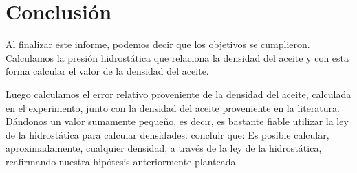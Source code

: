 \documentclass[a4paper, 12p]{article}
\begin{document}
\section{Conclusión}

Al finalizar este informe, podemos decir que los objetivos se cumplieron. Calculamos la presión hidrostática que relaciona la densidad del aceite y con esta forma calcular el valor de la densidad del aceite.

Luego calculamos el error relativo proveniente de la densidad del aceite, calculada en el experimento, junto con la densidad del aceite proveniente en la literatura. Dándonos un valor sumamente pequeño, es decir, es bastante fiable utilizar la ley de la hidrostática para calcular densidades.
concluir que:
Es posible calcular, aproximadamente, cualquier densidad, a través de la ley de la hidrostática, reafirmando nuestra hipótesis anteriormente planteada.






      
      
      
      
      
      
      
      
      
      
      
      
      
      
\end{document}
